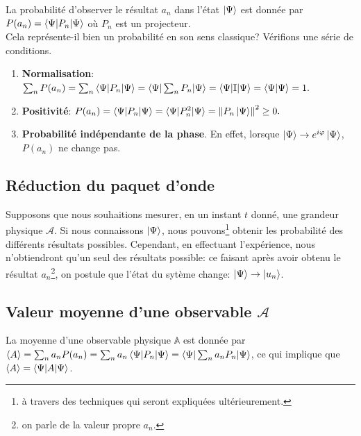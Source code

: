 \documentclass[../notesdecours.tex]{subfiles}
\begin{document}
La probabilité d'observer le résultat $a_n$ dans l'état $\ket{\Psi}$ est donnée par $P(a_n) = \braket{\Psi|P_n|\Psi}$ où $P_n$ est un projecteur.\\

Cela représente-il bien un probabilité en son sens classique? Vérifions une série de conditions.
\begin{enumerate}
\item \textbf{Normalisation}: $\sum_n P(a_n) = \sum_n \braket{\Psi|P_n|\Psi} = \braket{\Psi|\sum_n P_n|\Psi} = \braket{\Psi|\mathbb{I}|\Psi} = \braket{\Psi|\Psi} = 1.$
\item \textbf{Positivité}: $P(a_n) = \braket{\Psi|P_n|\Psi} = \braket{\Psi|P_n^2|\Psi} = \norm{P_n\ket{\Psi}}^2 \geq 0.$
\item \textbf{Probabilité indépendante de la phase}. En effet, lorsque $\ket{\Psi}\to e^{i\varphi}\ket{\Psi}$, $P(a_n)$ ne change pas.
\end{enumerate}
\subsection{Réduction du paquet d'onde}
Supposons que nous souhaitions mesurer, en un instant $t$ donné, une grandeur physique $\mathcal{A}$. Si nous connaissons $\ket{\Psi}$, nous pouvons\footnote{à travers des techniques qui seront expliquées ultérieurement.} obtenir les probabilité des différents résultats possibles. Cependant, en effectuant l'expérience, nous n'obtiendront qu'un seul des résultats possible: ce faisant après avoir obtenu le résultat $a_n$\footnote{on parle de la valeur propre $a_n$.}, on postule que l'état du sytème change: $\ket{\Psi} \to \ket{u_n}$.
\begin{center}
\end{center}

\newpage
\subsection{Valeur moyenne d'une observable $\mathcal{A}$}
La moyenne d'une observable physique $\mathbb{A}$ est donnée par $\langle A\rangle =\sum_n a_n P(a_n) = \sum_n a_n \braket{\Psi|P_n|\Psi} = \braket{\Psi|\sum_n a_n P_n | \Psi}$, ce qui implique que $\langle A\rangle = \braket{\Psi|A|\Psi}$.
\end{document}
